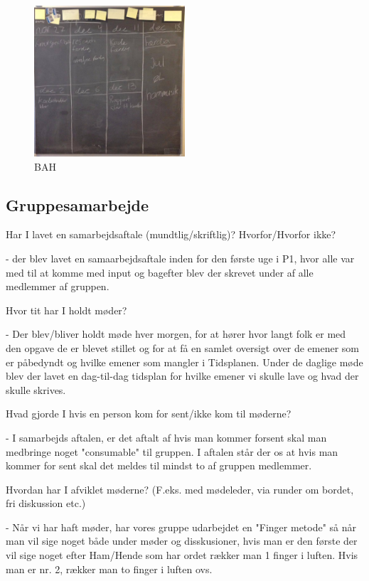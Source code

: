 \documentclass[a4paper,12pt,twoside,openright]{memoir}
\begin{document}
            \begin{figure}[ht!]
                \centering
                \includegraphics[width=0.5\textwidth]{Images/2.jpg}
                \caption{BAH}
                \label{4}
            \end{figure}

        \subsection{Gruppesamarbejde}

            Har I lavet en samarbejdsaftale (mundtlig/skriftlig)? Hvorfor/Hvorfor ikke?

            - der blev lavet en samaarbejdsaftale inden for den første uge i P1, hvor alle var med til at komme med input og bagefter blev der skrevet under af alle medlemmer af gruppen.

            Hvor tit har I holdt møder?

            - Der blev/bliver holdt møde hver morgen, for at hører hvor langt folk er med den opgave de er blevet stillet og for at få en samlet oversigt over de emener som er påbedyndt og hvilke emener som mangler i Tidsplanen. Under de daglige møde blev der lavet en dag-til-dag tidsplan for hvilke emener vi skulle lave og hvad der skulle skrives.

            Hvad gjorde I hvis en person kom for sent/ikke kom til møderne?

            - I samarbejds aftalen, er det aftalt af hvis man kommer forsent skal man medbringe noget "consumable" til gruppen. I aftalen står der os at hvis man kommer for sent skal det meldes til mindst to af gruppen medlemmer.

            Hvordan har I afviklet møderne? (F.eks. med mødeleder, via runder om bordet, fri diskussion etc.)

            - Når vi har haft møder, har vores gruppe udarbejdet en "Finger metode" så når man vil sige noget både under møder og disskusioner, hvis man er den første der vil sige noget efter Ham/Hende som har ordet rækker man 1 finger i luften. Hvis man er nr. 2, rækker man to finger i luften ovs.
\end{document}
